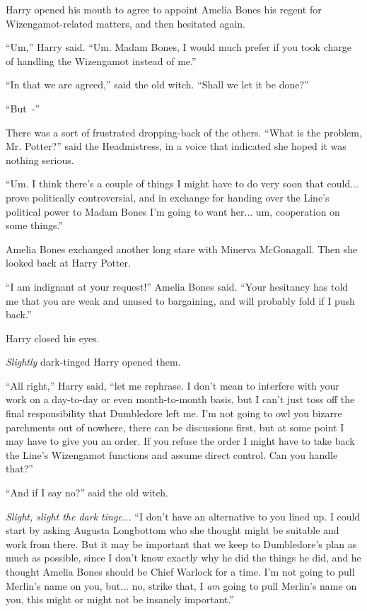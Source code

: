 Harry opened his mouth to agree to appoint Amelia Bones his regent for Wizengamot-related matters, and then hesitated again.

``Um,'' Harry said. ``Um. Madam Bones, I would much prefer if you took charge of handling the Wizengamot instead of me.''

``In that we are agreed,'' said the old witch. ``Shall we let it be done?''

``But~-''

There was a sort of frustrated dropping-back of the others. ``What is the problem, Mr. Potter?'' said the Headmistress, in a voice that indicated she hoped it was nothing serious.

``Um. I think there's a couple of things I might have to do very soon that could... prove politically controversial, and in exchange for handing over the Line's political power to Madam Bones I'm going to want her... um, cooperation on some things.''

Amelia Bones exchanged another long stare with Minerva McGonagall. Then she looked back at Harry Potter.

``I am indignant at your request!'' Amelia Bones said. ``Your hesitancy has told me that you are weak and unused to bargaining, and will probably fold if I push back.''

Harry closed his eyes.

\emph{Slightly} dark-tinged Harry opened them.

``All right,'' Harry said, ``let me rephrase. I don't mean to interfere with your work on a day-to-day or even month-to-month basis, but I can't just toss off the final responsibility that Dumbledore left me. I'm not going to owl you bizarre parchments out of nowhere, there can be discussions first, but at some point I may have to give you an order. If you refuse the order I might have to take back the Line's Wizengamot functions and assume direct control. Can you handle that?''

``And if I say no?'' said the old witch.

\emph{Slight, slight the dark tinge...} ``I don't have an alternative to you lined up. I could start by asking Augusta Longbottom who she thought might be suitable and work from there. But it may be important that we keep to Dumbledore's plan as much as possible, since I don't know exactly why he did the things he did, and he thought Amelia Bones should be Chief Warlock for a time. I'm not going to pull Merlin's name on you, but... no, strike that, I \emph{am} going to pull Merlin's name on you, this might or might not be insanely important.''

